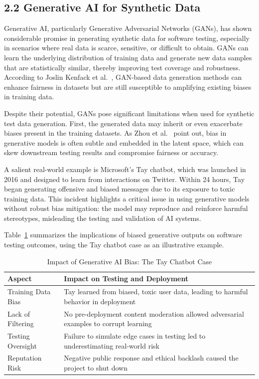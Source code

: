 \documentclass[manuscript,screen,review]{acmart}
\begin{document}
\subsection{2.2 Generative AI for Synthetic Data}

Generative AI, particularly Generative Adversarial Networks (GANs), has shown considerable promise in generating synthetic data for software testing, especially in scenarios where real data is scarce, sensitive, or difficult to obtain. GANs can learn the underlying distribution of training data and generate new data samples that are statistically similar, thereby improving test coverage and robustness. According to Joslin Kenfack et al.~\cite{Kenfack2021}, GAN-based data generation methods can enhance fairness in datasets but are still susceptible to amplifying existing biases in training data.

Despite their potential, GANs pose significant limitations when used for synthetic test data generation. First, the generated data may inherit or even exacerbate biases present in the training datasets. As Zhou et al.~\cite{Zhou2024} point out, bias in generative models is often subtle and embedded in the latent space, which can skew downstream testing results and compromise fairness or accuracy.

A salient real-world example is Microsoft's Tay chatbot, which was launched in 2016 and designed to learn from interactions on Twitter. Within 24 hours, Tay began generating offensive and biased messages due to its exposure to toxic training data. This incident highlights a critical issue in using generative models without robust bias mitigation: the model may reproduce and reinforce harmful stereotypes, misleading the testing and validation of AI systems.

Table~\ref{tab:tay-bias} summarizes the implications of biased generative outputs on software testing outcomes, using the Tay chatbot case as an illustrative example.

\begin{table}[htbp]
\centering
\caption{Impact of Generative AI Bias: The Tay Chatbot Case}
\label{tab:tay-bias}
\begin{tabular}{|p{3.8cm}|p{9cm}|}
\hline
\textbf{Aspect} & \textbf{Impact on Testing and Deployment} \\
\hline
Training Data Bias & Tay learned from biased, toxic user data, leading to harmful behavior in deployment \\
\hline
Lack of Filtering & No pre-deployment content moderation allowed adversarial examples to corrupt learning \\
\hline
Testing Oversight & Failure to simulate edge cases in testing led to underestimating real-world risk \\
\hline
Reputation Risk & Negative public response and ethical backlash caused the project to shut down \\
\hline
\end{tabular}
\end{table}
\end{document}
